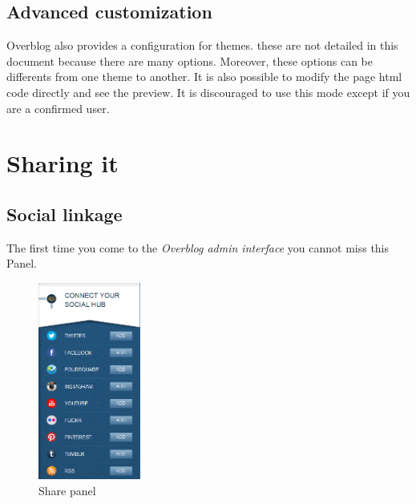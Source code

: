 \documentclass[a4paper,10pt]{article}
\begin{document}
\subsection{Advanced customization}
Overblog also provides a configuration for themes. these are not detailed in this document because there are many options. Moreover, these
options can be differents from one theme to another. It is also possible to modify the page html code directly and see the preview. It is discouraged to use
this mode except if you are a confirmed user.


\newpage
\section{Sharing it}

\subsection{Social linkage}

The first time you come to the  \emph{Overblog admin interface} you cannot miss this Panel.
\begin{figure}[h]
    \center
  \includegraphics[width=0.3\textwidth]{Images/shareIni.png}
    \caption{Share panel}
\end{figure}
\end{document}
